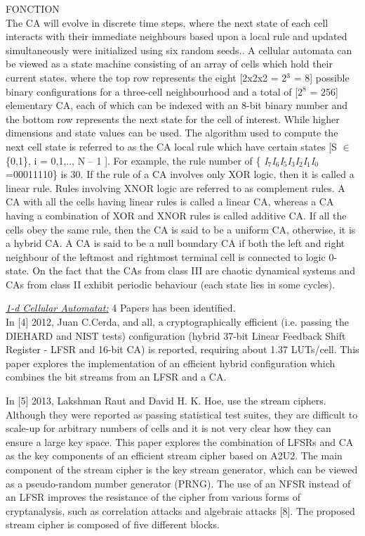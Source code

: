%
\label{Cellular Automata}
FONCTION\\
The CA will evolve in discrete time steps, where the next state of each cell interacts with their immediate neighbours based upon a local rule and updated simultaneously were initialized using six random seeds.. A cellular automata can be viewed as a state machine consisting of an array of cells which hold their current states. where the top row represents the eight [2x2x2 = 2${}^{3}$ = 8] possible binary configurations for a three-cell neighbourhood and a total of [2${}^{8}$ = 256] elementary CA, each of which can be indexed with an 8-bit binary number and the bottom row represents the next state for the cell of interest. While higher dimensions and state values can be used. The algorithm used to compute the next cell state is referred to as the CA local rule which have certain states [S $\in $ \{0,1\}, i = 0,1,.., N -- 1 ]. For example, the rule number of \{ \textit{I${}_{7}$I${}_{6}$I${}_{5}$I${}_{3}$I${}_{2}$I${}_{1}$I${}_{0}$} =00011110\} is 30. If the rule of a CA involves only XOR logic, then it is called a linear rule. Rules involving XNOR logic are referred to as complement rules. A CA with all the cells having linear rules is called a linear CA, whereas a CA having a combination of XOR and XNOR rules is called additive CA. If all the cells obey the same rule, then the CA is said to be a uniform CA, otherwise, it is a hybrid CA. A CA is said to be a null boundary CA if both the left and right neighbour of the leftmost and rightmost terminal cell is connected to logic 0-state. On the fact that the CAs from class III are chaotic dynamical systems and CAs from class II exhibit periodic behaviour (each state lies in some cycles).

\underline{\textit{1-d Cellular Automatat:}} 4 Papers has been identified.\\
In [4] 2012, Juan C.Cerda, and all, a cryptographically efficient (i.e. passing the DIEHARD and NIST tests) configuration (hybrid 37-bit Linear Feedback Shift Register - LFSR and 16-bit CA) is reported, requiring about 1.37 LUTs/cell. This paper explores the implementation of an efficient hybrid configuration which combines the bit streams from an LFSR and a CA. 

In [5] 2013, Lakshman Raut and David H. K. Hoe, use the stream ciphers. Although they were reported as passing statistical test suites, they are difficult to scale-up for arbitrary numbers of cells and it is not very clear how they can ensure a large key space. This paper explores the combination of LFSRs and CA as the key components of an efficient stream cipher based on A2U2. The main component of the stream cipher is the key stream generator, which can be viewed as a pseudo-random number generator (PRNG). The use of an NFSR instead of an LFSR improves the resistance of the cipher from various forms of cryptanalysis, such as correlation attacks and algebraic attacks [8]. The proposed stream cipher is composed of five different blocks.
 
